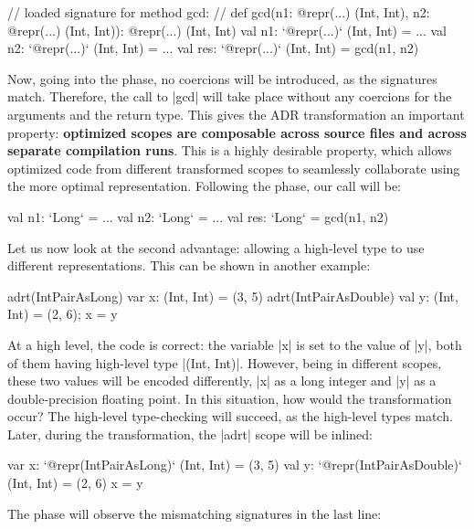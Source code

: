 \begin{lstlisting-nobreak}
// loaded signature for method gcd:
//  def gcd(n1: @repr(...) (Int, Int), n2: @repr(...) (Int, Int)): @repr(...) (Int, Int)
val n1: `@repr(...)` (Int, Int) = ...
val n2: `@repr(...)` (Int, Int) = ...
val res: `@repr(...)` (Int, Int) = gcd(n1, n2)
\end{lstlisting-nobreak}

Now, going into the \coerce{} phase, no coercions will be introduced, as the signatures match. Therefore, the call to |gcd| will take place without any coercions for the arguments and the return type. This gives the ADR transformation an important property: \textbf{optimized scopes are composable across source files and across separate compilation runs}. This is a highly desirable property, which allows optimized code from different transformed scopes to seamlessly collaborate using the more optimal representation. Following the \commit{} phase, our call will be:

\begin{lstlisting-nobreak}
val n1: `Long` = ...
val n2: `Long` = ...
val res: `Long` = gcd(n1, n2)
\end{lstlisting-nobreak}

Let us now look at the second advantage: allowing a high-level type to use different representations. This can be shown in another example:

\begin{lstlisting-nobreak}
adrt(IntPairAsLong)   { var x: (Int, Int) = (3, 5) }
adrt(IntPairAsDouble) { val y: (Int, Int) = (2, 6); x = y }
\end{lstlisting-nobreak}

At a high level, the code is correct: the variable |x| is set to the value of |y|, both of them having high-level type |(Int, Int)|. However, being in different scopes, these two values will be encoded differently, |x| as a long integer and |y| as a double-precision floating point. In this situation, how would the transformation occur? The high-level type-checking will succeed, as the high-level types match. Later, during the \inject{} transformation, the |adrt| scope will be inlined:

\begin{lstlisting-nobreak}
var x: `@repr(IntPairAsLong)` (Int, Int) = (3, 5)
val y: `@repr(IntPairAsDouble)` (Int, Int) = (2, 6)
x = y
\end{lstlisting-nobreak}

The \coerce{} phase will observe the mismatching signatures in the last line:

